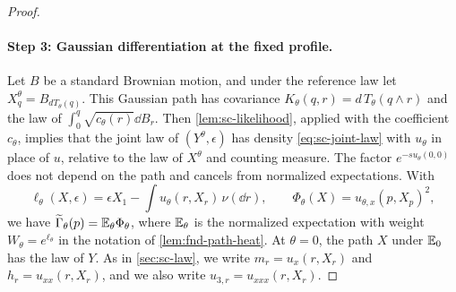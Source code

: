 \begin{proof}
\paragraph{Step 3: Gaussian differentiation at the fixed profile.}
Let $B$ be a standard Brownian motion, and under the reference law let
$X^\theta_q=B_{dT_\theta(q)}$. This Gaussian path has covariance
$K_\theta(q,r)=d\,T_\theta(q\wedge r)$ and the law of
$\int_0^q\sqrt{c_\theta(r)}\dd B_r$. Then \cref{lem:sc-likelihood},
applied with the coefficient $c_\theta$, implies that the joint law of $(Y^\theta,\epsilon)$
has density \eqref{eq:sc-joint-law} with $u_\theta$ in place of $u$,
relative to the law of $X^\theta$ and counting measure. The factor
$e^{-su_\theta(0,0)}$ does not depend on the path and cancels from
normalized expectations. With
\[
 \ell_\theta(X,\epsilon)=\epsilon X_1-\int u_\theta(r,X_r)\,\nu(\dd r),
 \qquad\Phi_\theta(X)=u_{\theta,x}(p,X_p)^2,
\]
we have
$\widetilde\Gamma_\theta(p)=\mathbb E_\theta\Phi_\theta$, where $\mathbb E_\theta$ is
the normalized expectation with weight $W_\theta=e^{\ell_\theta}$ in
the notation of \cref{lem:fnd-path-heat}. At $\theta=0$, the path $X$
under $\mathbb E_0$ has the law of $Y$. As in \cref{sec:sc-law}, we write
$m_r=u_x(r,X_r)$ and $h_r=u_{xx}(r,X_r)$, and we also write
$u_{3,r}=u_{xxx}(r,X_r)$.


\end{proof}
